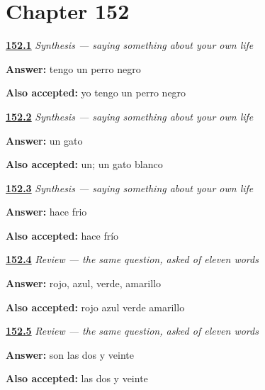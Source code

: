 \section*{Chapter 152}

\noindent\begin{minipage}[t]{\linewidth}
\raggedright
\hyperlink{review-ES-C40-sintesis-describir-have}{\textbf{152.1}} \emph{Synthesis — saying something about your own life}\par
\small \textbf{Answer:} tengo un perro negro\par
\footnotesize \textbf{Also accepted:} yo tengo un perro negro
\end{minipage}\par\medskip

\noindent\begin{minipage}[t]{\linewidth}
\raggedright
\hyperlink{review-ES-C40-sintesis-describir-article}{\textbf{152.2}} \emph{Synthesis — saying something about your own life}\par
\small \textbf{Answer:} un gato\par
\footnotesize \textbf{Also accepted:} un; un gato blanco
\end{minipage}\par\medskip

\noindent\begin{minipage}[t]{\linewidth}
\raggedright
\hyperlink{review-ES-C40-sintesis-describir-weather}{\textbf{152.3}} \emph{Synthesis — saying something about your own life}\par
\small \textbf{Answer:} hace frio\par
\footnotesize \textbf{Also accepted:} hace frío
\end{minipage}\par\medskip

\noindent\begin{minipage}[t]{\linewidth}
\raggedright
\hyperlink{review-ES-C40-repaso-palabras-con-historia-colores}{\textbf{152.4}} \emph{Review — the same question, asked of eleven words}\par
\small \textbf{Answer:} rojo, azul, verde, amarillo\par
\footnotesize \textbf{Also accepted:} rojo azul verde amarillo
\end{minipage}\par\medskip

\noindent\begin{minipage}[t]{\linewidth}
\raggedright
\hyperlink{review-ES-C40-repaso-palabras-con-historia-hora}{\textbf{152.5}} \emph{Review — the same question, asked of eleven words}\par
\small \textbf{Answer:} son las dos y veinte\par
\footnotesize \textbf{Also accepted:} las dos y veinte
\end{minipage}\par\medskip


